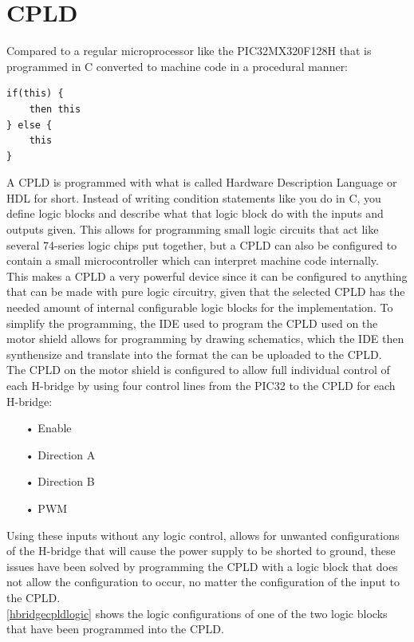 \section{CPLD}
Compared to a regular microprocessor like the PIC32MX320F128H that is programmed in C converted to machine code in a procedural manner:
\begin{lstlisting}
if(this) {
	then this
} else {
	this
}
\end{lstlisting}
A CPLD is programmed with what is called Hardware Description Language or HDL for short.
Instead of writing condition statements like you do in C, you define logic blocks and describe what that logic block do with the inputs and outputs given. \cite{HDL}
This allows for programming small logic circuits that act like several 74-series logic chips put together, but a CPLD can also be configured to contain a small microcontroller which can interpret machine code internally.\\
This makes a CPLD a very powerful device since it can be configured to anything that can be made with pure logic circuitry, given that the selected CPLD has the needed amount of internal configurable logic blocks for the implementation. \cite{CPLD}
To simplify the programming, the IDE used to program the CPLD used on the motor shield allows for programming by drawing schematics, which the IDE then synthensize and translate into the format the can be uploaded to the CPLD.\\
The CPLD on the motor shield is configured to allow full individual control of each H-bridge by using four control lines from the PIC32 to the CPLD for each H-bridge:
\begin{enumerate}
	\item[•]Enable
	\item[•]Direction A
	\item[•]Direction B
	\item[•]PWM
\end{enumerate}
Using these inputs without any logic control, allows for unwanted configurations of the H-bridge that will cause the power supply to be shorted to ground, these issues have been solved by programming the CPLD with a logic block that does not allow the configuration to occur, no matter the configuration of the input to the CPLD.\\
\ref{hbridgecpldlogic} shows the logic configurations of one of the two logic blocks that have been programmed into the CPLD.

